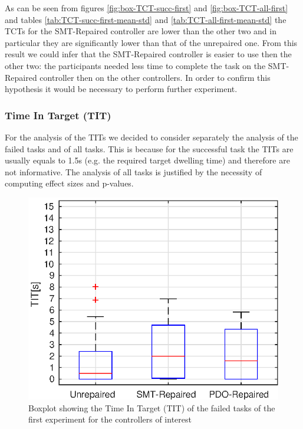 As can be seen from figures \ref{fig:box-TCT-succ-first} and \ref{fig:box-TCT-all-first} and tables \ref{tab:TCT-succ-first-mean-std} and \ref{tab:TCT-all-first-mean-std} the TCTs for the SMT-Repaired controller are lower than the other two and in particular they are significantly lower than that of the unrepaired one. From this result we could infer that the SMT-Repaired controller is easier to use then the other two: the participants needed less time to complete the task on the SMT-Repaired controller then on the other controllers. In order to confirm this hypothesis it would be necessary to perform further experiment.
%
%
%
%
%
\subsubsection{Time In Target (TIT)}\label{subsub:first-TIT}
For the analysis of the TITs we decided to consider separately the analysis of the failed tasks and of all tasks. This is because for the successful task the TITs are usually equals to 1.5s (e.g. the required target dwelling time) and therefore are not informative. The analysis of all tasks is justified by the necessity of computing effect sizes and p-values.
\begin{figure}[H]
    \centering
    \includegraphics[width=\textwidth]{Images/first-experiment/exp0_TIT_fail.eps}
    \caption{Boxplot showing the Time In Target (TIT) of the failed tasks of the first experiment for the controllers of interest}
    \label{fig:box-TIT-fail-first}
\end{figure}

